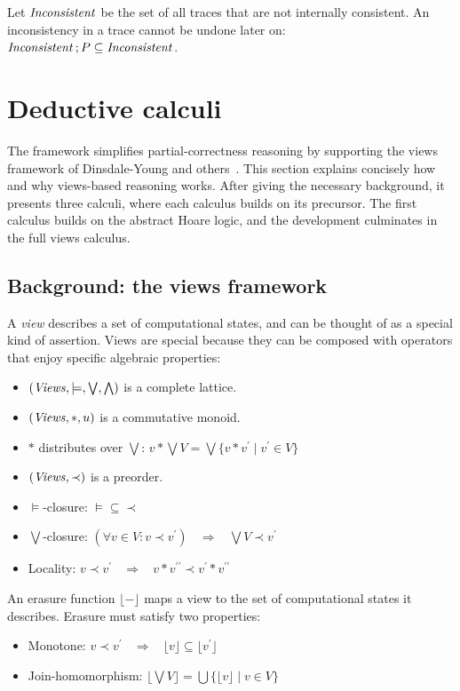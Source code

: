 \documentclass[a4paper,leqno]{llncs}
\newcommand{\mybox}[1]{\ensuremath{\text{\mbox{\ensuremath{#1}}}}}
\newcommand{\spacedwith}[2]{\ensuremath{\phantom{#2}#1\phantom{#2}}}
\newcommand{\spaced}[1]{\spacedwith{#1}{m}}
\newcommand{\primed}[1]{\ensuremath{#1^{\prime}}}
\newcommand{\dprimed}[1]{\ensuremath{#1^{\prime\prime}}}
\newcommand{\aleq}{\ensuremath{\subseteq}}
\newcommand{\asemicolon}{\ensuremath{\,;}}
\newcommand{\Inconsistent}{\mybox{\mathit{Inconsistent}}}
\newcommand{\Views}{\mybox{\mathit{Views}}}
\newcommand{\vstar}{\ensuremath{*}}
\newcommand{\vunit}{\ensuremath{u}}
\newcommand{\vmodels}{\ensuremath{\models}}
\newcommand{\vlub}{\ensuremath{\bigvee}}
\newcommand{\vglb}{\ensuremath{\bigwedge}}
\newcommand{\vangelic}{\ensuremath{\prec}}
\newcommand{\view}{\ensuremath{v}}
\newcommand{\vprime}{\primed{v}}
\newcommand{\vdprime}{\dprimed{\view}}
\newcommand{\erase}[1]{\ensuremath{\lfloor{#1}\rfloor}}
\newcommand{\simplies}{\spaced{\Rightarrow}}
\begin{document}
Let \Inconsistent{} be the set of all traces that are not internally consistent. An inconsistency in a trace cannot be undone later on: $\Inconsistent \asemicolon P \aleq \Inconsistent$.

\section{Deductive calculi}\label{DeductiveCalculi}
The framework simplifies partial-correctness reasoning by supporting the views framework of Dinsdale-Young and others~\cite{dinsdale-young12views}. This section explains concisely how and why views-based reasoning works. After giving the necessary background, it presents three calculi, where each calculus builds on its precursor. The first calculus builds on the abstract Hoare logic, and the development culminates in the full views calculus.
\subsection{Background: the views framework}
A \emph{view} describes a set of computational states, and can be thought of as a special kind of assertion. Views are special because they can be composed with operators that enjoy specific algebraic properties:
\begin{itemize}
\item $(\Views, \vmodels, \vlub, \vglb)$ is a complete lattice.
\item $(\Views, \vstar, \vunit)$ is a commutative monoid.
\item \vstar{} distributes over \vlub: $\view \vstar \vlub V = \vlub\{\view \vstar \vprime \mid \vprime \in V\}$
\item $(\Views, \vangelic)$ is a preorder.
\item \vmodels-closure: $\vmodels \subseteq \vangelic$
\item \vlub-closure: $(\forall \view \in V : \view \vangelic \vprime) \simplies \vlub V \vangelic \vprime$
\item Locality: $\view \vangelic \vprime \simplies \view \vstar \vdprime \vangelic \vprime \vstar \vdprime$
\end{itemize}


An erasure function $\erase{-}$ maps a view to the set of computational states it describes. Erasure must satisfy two properties:
\begin{itemize}
\item Monotone: $\view \vangelic \vprime \simplies \erase{\view} \subseteq \erase{\vprime}$
\item Join-homomorphism: $\erase{\vlub V} = \bigcup\{\erase{\view} \mid \view \in V\}$
\end{itemize}
\end{document}
